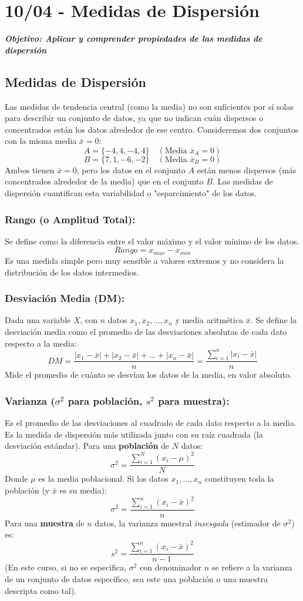 \documentclass[12pt, letterpaper]{article}
\begin{document}
\section{10/04 - Medidas de Dispersión}
\textbf{\textit{Objetivo: Aplicar y comprender propiedades de las medidas de dispersión}}
\subsection{Medidas de Dispersión}
Las medidas de tendencia central (como la media) no son suficientes por sí solas para describir un conjunto de datos, ya que no indican cuán dispersos o concentrados están los datos alrededor de ese centro. Consideremos dos conjuntos con la misma media $\bar{x}=0$:
\[ A = \{-4, 4, -4, 4\} \quad (\text{Media } \bar{x}_A = 0) \]
\[ B = \{7, 1, -6, -2\} \quad (\text{Media } \bar{x}_B = 0) \]
Ambos tienen $\bar{x}=0$, pero los datos en el conjunto $A$ están menos dispersos (más concentrados alrededor de la media) que en el conjunto $B$. Las medidas de dispersión cuantifican esta variabilidad o "esparcimiento" de los datos.

\subsubsection{Rango (o Amplitud Total):}
Se define como la diferencia entre el valor máximo y el valor mínimo de los datos.
\[ Rango = x_{max} - x_{min} \]
Es una medida simple pero muy sensible a valores extremos y no considera la distribución de los datos intermedios.

\subsubsection{Desviación Media (DM):}
Dada una variable $X$, con $n$ datos $x_1, x_2, \dots, x_n$ y media aritmética $\bar{x}$. Se define la desviación media como el promedio de las desviaciones absolutas de cada dato respecto a la media:
\[ DM = \frac{|x_1-\bar{x}|+|x_2-\bar{x}|+\dots+|x_n-\bar{x}|}{n} = \frac{\sum_{i=1}^{n} |x_i - \bar{x}|}{n} \]
Mide el promedio de cuánto se desvían los datos de la media, en valor absoluto.

\subsubsection{Varianza ($\sigma^2$ para población, $s^2$ para muestra):}
Es el promedio de las desviaciones al cuadrado de cada dato respecto a la media. Es la medida de dispersión más utilizada junto con su raíz cuadrada (la desviación estándar).
Para una \textbf{población} de $N$ datos:
\[ \sigma^2 = \frac{\sum_{i=1}^{N} (x_i - \mu)^2}{N} \]
Donde $\mu$ es la media poblacional. Si los datos $x_1, \dots, x_n$ constituyen toda la población (y $\bar{x}$ es su media):
\[ \sigma^2 = \frac{\sum_{i=1}^{n} (x_i - \bar{x})^2}{n} \]
Para una \textbf{muestra} de $n$ datos, la varianza muestral \textit{insesgada} (estimador de $\sigma^2$) es:
\[ s^2 = \frac{\sum_{i=1}^{n} (x_i - \bar{x})^2}{n-1} \]
(En este curso, si no se especifica, $\sigma^2$ con denominador $n$ se refiere a la varianza de un conjunto de datos específico, sea este una población o una muestra descripta como tal).
\end{document}
